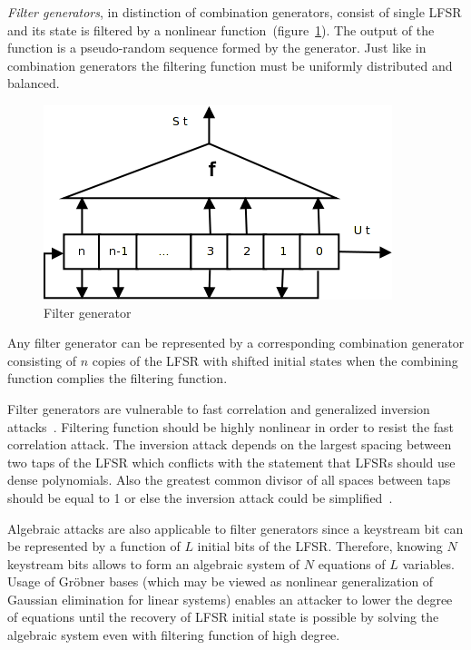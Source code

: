 \textit{Filter generators}, in distinction of combination generators, consist of 
single LFSR and its state is filtered by a nonlinear 
function~(figure~\ref{fig:filter-gen}). The output of the function is a
pseudo-random sequence formed by the generator. Just like in combination
generators the filtering function must be uniformly distributed and balanced.
\begin{figure}[htbp]
    \centering
    \includegraphics[scale=0.5]{images/filter-gen}
    \caption{Filter generator}
    \label{fig:filter-gen}
\end{figure}

Any filter generator can be represented by a corresponding combination generator
consisting of $n$ copies of the LFSR with shifted initial states when the
combining function complies the filtering function.

Filter generators are vulnerable to fast correlation and generalized inversion
attacks~\cite{canteaut:invattack}. Filtering function should be highly nonlinear
in order to resist the fast correlation attack. The inversion attack depends on
the largest spacing between two taps of the LFSR which conflicts with the
statement that LFSRs should use dense polynomials. Also the greatest common
divisor of all spaces between taps should be equal to 1 or else the inversion
attack could be simplified~\cite{encyclopedia_of_cryptography}. 

Algebraic attacks are also applicable to filter generators since a keystream
bit can be represented by a function of $L$ initial bits of the LFSR. Therefore,
knowing $N$ keystream bits allows to form an algebraic system of $N$ equations
of $L$ variables. Usage of Gr\"obner bases (which may be viewed as nonlinear
generalization of Gaussian elimination for linear systems) enables an attacker 
to lower the degree of equations until the recovery of LFSR initial state is
possible by solving the algebraic system even with filtering function of high
degree. 

